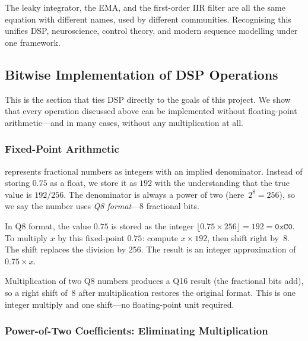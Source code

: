 \begin{keyinsight}
The leaky integrator, the EMA, and the first-order IIR filter are
all the same equation with different names, used by different
communities. Recognising this unifies DSP, neuroscience, control
theory, and modern sequence modelling under one framework.
\end{keyinsight}

\subsection{Bitwise Implementation of DSP Operations}
\label{sec:dsp-bitwise}

This is the section that ties DSP directly to the goals of this
project. We show that every operation discussed above can be
implemented without floating-point arithmetic---and in many cases,
without any multiplication at all.

\subsubsection{Fixed-Point Arithmetic}

 represents fractional numbers as
integers with an implied denominator. Instead of storing $0.75$ as a
float, we store it as $192$ with the understanding that the true value
is $192 / 256$. The denominator is always a power of two
(here~$2^8 = 256$), so we say the number uses \emph{Q8 format}---8
fractional bits.

\begin{engineernote}
In Q8 format, the value $0.75$ is stored as the integer
$\lfloor 0.75 \times 256 \rfloor = 192 = \texttt{0xC0}$.
To multiply $x$ by this fixed-point $0.75$:
compute $x \times 192$, then shift right by~8.
The shift replaces the division by $256$.
The result is an integer approximation of $0.75 \times x$.
\end{engineernote}

Multiplication of two Q8 numbers produces a Q16 result (the fractional
bits add), so a right shift of~8 after multiplication restores the
original format. This is one integer multiply and one shift---no
floating-point unit required.

\subsubsection{Power-of-Two Coefficients: Eliminating Multiplication}

